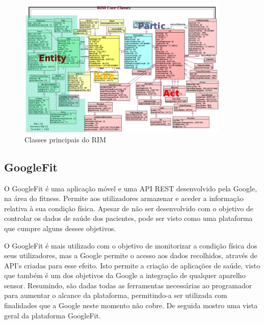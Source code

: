 \begin{figure}[H]
  \centering
  \includegraphics[width=0.9\textwidth]{imgs/hl7-rim.png}
  \caption[Classes principais do \gls{RIM}]{Classes principais do \gls{RIM} \cite{hl7-rim}}
  
  \label{f:rimclass}
\end{figure}


\subsection{GoogleFit}

O GoogleFit é uma aplicação móvel e uma \gls{API} \gls{REST} desenvolvido pela Google, na área do fitness. Permite aos utilizadores armazenar e aceder a informação relativa à sua condição física. Apesar de não ser desenvolvido com o objetivo de controlar os dados de saúde dos pacientes, pode ser visto como uma plataforma que cumpre alguns desses objetivos.
\par 
O GoogleFit é mais utilizado com o objetivo de monitorizar a condição física dos seus utilizadores, mas a Google permite o acesso aos dados recolhidos, através de \gls{API}’s criadas para esse efeito. Isto permite a criação de aplicações de saúde, visto que também é um dos objetivos da Google a integração de qualquer aparelho sensor. Resumindo, são dadas todas as ferramentas necessárias ao programador para aumentar o alcance da plataforma, permitindo-a ser utilizada com finalidades que a Google neste momento não cobre. 
De seguida mostro uma vista geral da plataforma GoogleFit.

